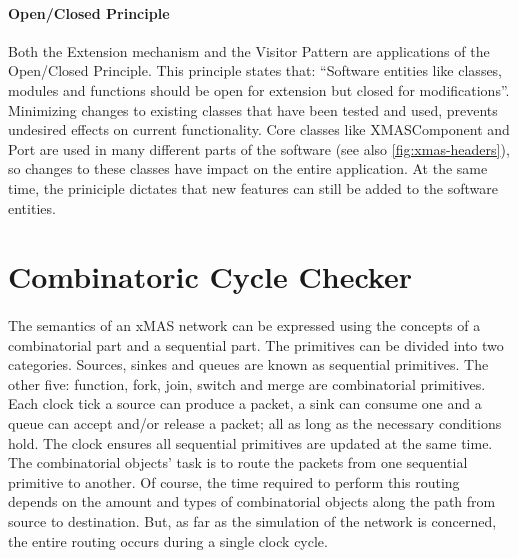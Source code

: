 \documentclass[a4paper,11pt]{article}
\begin{document}
\paragraph{Open/Closed Principle}
Both the Extension mechanism and the Visitor Pattern are applications of the Open/Closed
Principle. This principle states that: ``Software entities like classes, modules and functions
should be open for extension but closed for modifications''\cite{oodesign-open-close}. Minimizing
changes to existing classes that have been tested and used, prevents undesired effects
on current functionality. Core classes like XMASComponent and Port are used in many different parts
of the software (see also \ref{fig:xmas-headers}), so changes to these classes have impact on the entire application.
At the same time, the priniciple dictates that new features can still be added to the software entities.


\section{Combinatoric Cycle Checker}

\paragraph{}
The semantics of an xMAS network can be expressed using the concepts of a combinatorial part and
a sequential part\cite{analyse-tool-11}. The primitives can be divided into two categories.
Sources, sinkes and queues are known as sequential primitives. The other five: function,
fork, join, switch and merge are combinatorial primitives.\\
Each clock tick a source can produce a packet, a sink can consume one and a queue can accept
and/or release a packet; all as long as the necessary conditions hold. The clock ensures
all sequential primitives are updated at the same time.\\
The combinatorial objects' task is to route the packets from one sequential primitive to another.
Of course, the time required to perform this routing depends on the amount and types of
combinatorial objects along the path from source to destination. But, as far as the simulation of
the network is concerned, the entire routing occurs during a single clock cycle.\\
\end{document}
